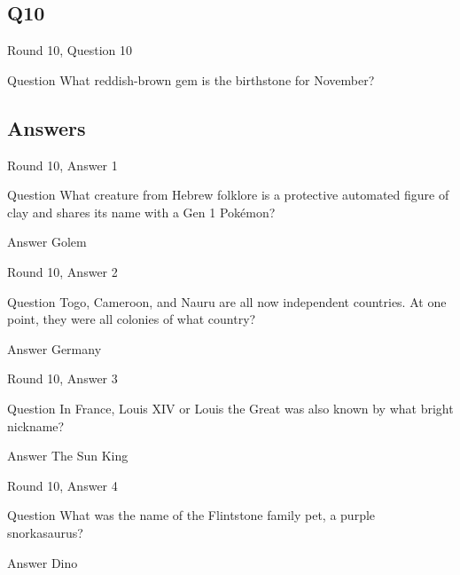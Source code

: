 \documentclass[11pt]{beamer}
\begin{document}
\subsection*{Q10}
\begin{frame}[t]{Round 10, Question 10}
\vspace{2em}
\begin{block}{Question}
What reddish-brown gem is the birthstone for November\@?
\end{block}
\end{frame}
    
\subsection{Answers}

\begin{frame}[t]{Round 10, Answer 1}
\vspace{2em}
\begin{block}{Question}
What creature from Hebrew folklore is a protective automated figure of clay and shares its name with a Gen 1 Pokémon\@?
\end{block}
\pause{}
\begin{block}{Answer}
Golem
\end{block}
\end{frame}
    

\begin{frame}[t]{Round 10, Answer 2}
\vspace{2em}
\begin{block}{Question}
Togo, Cameroon, and Nauru are all now independent countries. At one point, they were all colonies of what country\@?
\end{block}
\pause{}
\begin{block}{Answer}
Germany
\end{block}
\end{frame}
    

\begin{frame}[t]{Round 10, Answer 3}
\vspace{2em}
\begin{block}{Question}
In France, Louis XIV or Louis the Great was also known by what bright nickname\@?
\end{block}
\pause{}
\begin{block}{Answer}
The Sun King
\end{block}
\end{frame}
    

\begin{frame}[t]{Round 10, Answer 4}
\vspace{2em}
\begin{block}{Question}
What was the name of the Flintstone family pet, a purple snorkasaurus\@?
\end{block}
\pause{}
\begin{block}{Answer}
Dino
\end{block}
\end{frame}
    
\end{document}
